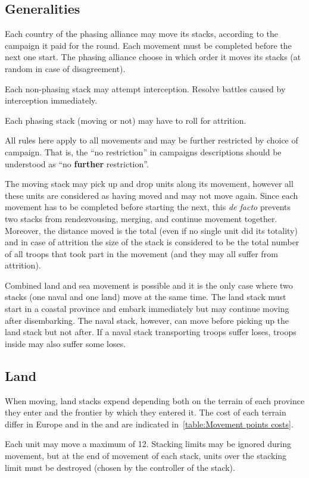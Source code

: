\subsection{Generalities}
Each country of the phasing alliance may move its stacks, according to the
campaign it paid for the round. Each movement must be completed before the
next one start. The phasing alliance choose in which order it moves its stacks
(at random in case of disagreement).

Each non-phasing stack may attempt interception. Resolve battles caused by
interception immediately.

Each phasing stack (moving or not) may have to roll for attrition.

All rules here apply to all movements and may be further restricted by choice
of campaign. That is, the ``no restriction'' in campaigns descriptions should
be understood as ``no \textbf{further} restriction''.

The moving stack may pick up and drop units along its movement, however all
these units are considered as having moved and may not move again. Since each
movement has to be completed before starting the next, this \emph{de facto}
prevents two stacks from rendezvousing, merging, and continue movement
together. Moreover, the distance moved is the total (even if no single unit
did its totality) and in case of attrition the size of the stack is considered
to be the total number of all troops that took part in the movement (and they
may all suffer from attrition).

Combined land and sea movement is possible and it is the only case where two
stacks (one naval and one land) move at the same time. The land stack must
start in a coastal province and embark immediately but may continue moving
after disembarking. The naval stack, however, can move before picking up the
land stack but not after. If a naval stack transporting troops suffer loses,
troops inside may also suffer some loses.

\subsection{Land}
When moving, land stacks expend \MP depending both on the terrain of each
province they enter and the frontier by which they entered it. The cost of
each terrain differ in Europe and in the \ROTW and are indicated
in~\ref{table:Movement points costs}.


Each unit may move a maximum of 12\MP. Stacking limits may be ignored during
movement, but at the end of movement of each stack, units over the stacking
limit must be destroyed (chosen by the controller of the stack).

